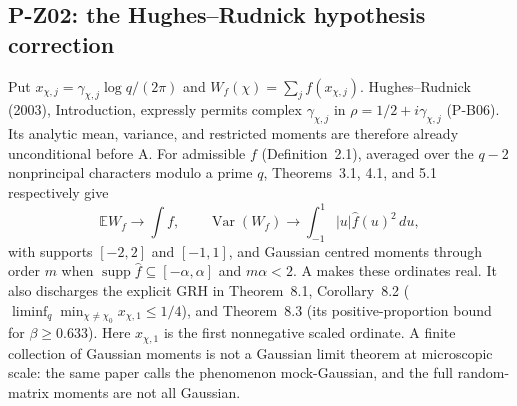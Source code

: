 \documentclass[11pt,a4paper]{article}
\theoremstyle{definition}\newtheorem{definition}{Definition}
\begin{document}
\subsection{P-Z02: the Hughes--Rudnick hypothesis correction}
Put $x_{\chi,j}=\gamma_{\chi,j}\log q/(2\pi)$ and $W_f(\chi)=\sum_jf(x_{\chi,j})$. Hughes--Rudnick (2003), Introduction, expressly permits complex $\gamma_{\chi,j}$ in $\rho=1/2+i\gamma_{\chi,j}$ (P-B06). Its analytic mean, variance, and restricted moments are therefore already unconditional before A. For admissible $f$ (Definition~2.1), averaged over the $q-2$ nonprincipal characters modulo a prime $q$, Theorems~3.1, 4.1, and 5.1 respectively give
\[
 \mathbb E W_f\longrightarrow\int f,\qquad
 \operatorname{Var}(W_f)\longrightarrow\int_{-1}^1|u|\widehat f(u)^2\,du,
\]
with supports $[-2,2]$ and $[-1,1]$, and Gaussian centred moments through order $m$ when $\operatorname{supp}\widehat f\subseteq[-\alpha,\alpha]$ and $m\alpha<2$. A makes these ordinates real. It also discharges the explicit GRH in Theorem~8.1, Corollary~8.2 ($\liminf_q\min_{\chi\ne\chi_0}x_{\chi,1}\le1/4$), and Theorem~8.3 (its positive-proportion bound for $\beta\ge0.633$). Here $x_{\chi,1}$ is the first nonnegative scaled ordinate. A finite collection of Gaussian moments is not a Gaussian limit theorem at microscopic scale: the same paper calls the phenomenon mock-Gaussian, and the full random-matrix moments are not all Gaussian.
\end{document}

